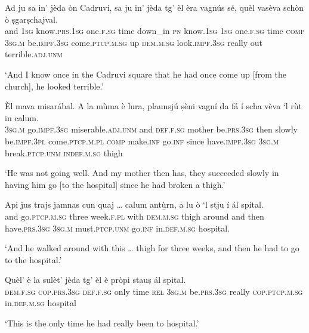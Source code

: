 \begin{linenumbers}
\gll  Ad ju sa in' jèda òn Cadruvi\footnotemark, sa ju in' jèda tg’ èl èra vagnús sé, quèl vasèva schòn ò ṣgarṣchajval.  \\
and \textsc{1sg} know.\textsc{prs.1sg} one.\textsc{f.sg} time down\_in \textsc{pn} know.\textsc{1sg} \textsc{1sg} one.\textsc{f.sg} time \textsc{comp} \textsc{3sg.m} be.\textsc{impf.3sg} come.\textsc{ptcp.m.sg} up \textsc{dem.m.sg} look.\textsc{impf.3sg} really out terrible.\textsc{adj.unm}\\
\end{linenumbers}
\medskip
\glt `And I know once in the Cadruvi square that he had once come up [from the church], he looked terrible.'
\medskip

\begin{linenumbers}
\gll   Èl mava misarábal. A la mùma è lura, plaunsjú ṣèni vagní da fá í scha vèva `l rùt in calum.\\
 \textsc{3sg.m} go.\textsc{impf.3sg} miserable.\textsc{adj.unm} and \textsc{def.f.sg} mother be.\textsc{prs.3sg} then slowly be.\textsc{impf.3pl} come.\textsc{ptcp.m.pl} \textsc{comp} make.\textsc{inf} go.\textsc{inf} since have.\textsc{impf.3sg} \textsc{3sg.m} break.\textsc{ptcp.unm} \textsc{indef.m.sg} thigh \\
\end{linenumbers}
\medskip
\glt `He was not going well. And my mother then has, they succeeded slowly in having him go [to the hospital] since he had broken a thigh.'
\medskip

\begin{linenumbers}
\gll  Api jus trajs jamnas cun quaj … calum antù̱rn, a lu ò `l stju í ál spital.  \\
and go.\textsc{ptcp.m.sg} three week.\textsc{f.pl} with \textsc{dem.m.sg} {} thigh around and then have.\textsc{prs.3sg} \textsc{3sg.m} must.\textsc{ptcp.unm} go.\textsc{inf} in.\textsc{def.m.sg} hospital. \\
\end{linenumbers}
\medskip
\glt `And he walked around with this … thigh for three weeks, and then he had to go to the hospital.'
\medskip

\begin{linenumbers}
\gll  Quèl’ è la sulèt’ jèda tg’ èl è pròpi stauṣ ál spital.  \\
 \textsc{dem.f.sg} \textsc{cop.prs.3sg} \textsc{def.f.sg} only time \textsc{rel} \textsc{3sg.m} be.\textsc{prs.3sg} really \textsc{cop.ptcp.m.sg} in.\textsc{def.m.sg} hospital  \\
\end{linenumbers}
\medskip
\glt `This is the only time he had really been to hospital.'
\medskip

